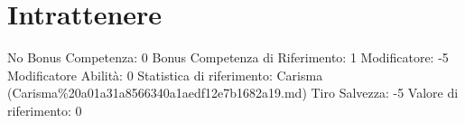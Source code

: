 \section{Intrattenere}\label{intrattenere}

\begin{description}
\tightlist
\item[Tags: ABI]
No Bonus Competenza: 0 Bonus Competenza di Riferimento: 1 Modificatore:
-5 Modificatore Abilità: 0 Statistica di riferimento: Carisma
(Carisma\%20a01a31a8566340a1aedf12e7b1682a19.md) Tiro Salvezza: -5
Valore di riferimento: 0
\end{description}
